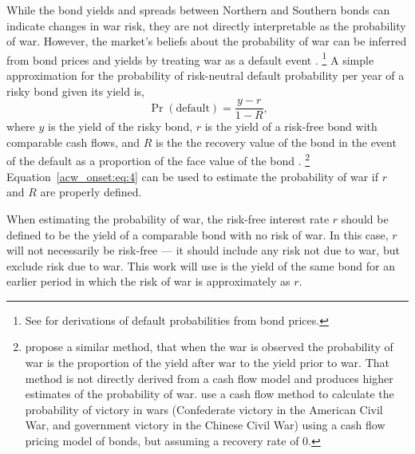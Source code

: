 While the bond yields and spreads between Northern and Southern bonds can indicate changes in war risk, they are not directly interpretable as the probability of war.
However, the market's beliefs about the probability of war can be inferred from bond prices and yields by treating war as a default event \parencite{HaberMitchenerOosterlinckEtAl2015}.%
\footnote{See \textcites{Fons1987}{Merrick2001}{Chan-Lau2006} for derivations of default probabilities from bond prices.}
A simple approximation for the probability of risk-neutral default probability per year of a risky bond given its yield is,
\begin{equation}
  \label{acw_onset:eq:4}
  \Pr(\text{default}) = \frac{y - r}{1 - R} \text{,}
\end{equation}
where $y$ is the yield of the risky bond, $r$ is the yield of a risk-free bond with comparable cash flows, and $R$ is the the recovery value of the bond in the event of the default as a proportion of the face value of the bond \parencite{HullPredescuWhite2004}.%
\footnote{\textcite[115]{WaldenstromFrey2008} propose a similar method, that when the war is observed the probability of war is the proportion of the yield after war to the yield prior to war.
  That method is not directly derived from a cash flow model and produces higher estimates of the probability of war.
  \textcite{HaberMitchenerOosterlinckEtAl2015} use a cash flow method to calculate the probability of victory in wars (Confederate victory in the American Civil War, and government victory in the Chinese Civil War) using a cash flow pricing model of bonds, but assuming a recovery rate of 0.
}
Equation~\eqref{acw_onset:eq:4} can be used to estimate the probability of war if $r$ and $R$ are properly defined.

When estimating the probability of war, the risk-free interest rate $r$ should be defined to be the yield of a comparable bond with no risk of war.
In this case, $r$ will not necessarily be risk-free --- it should include any risk not due to war, but exclude risk due to war.
This work will use is the yield of the same bond for an earlier period in which the risk of war is approximately as $r$.

